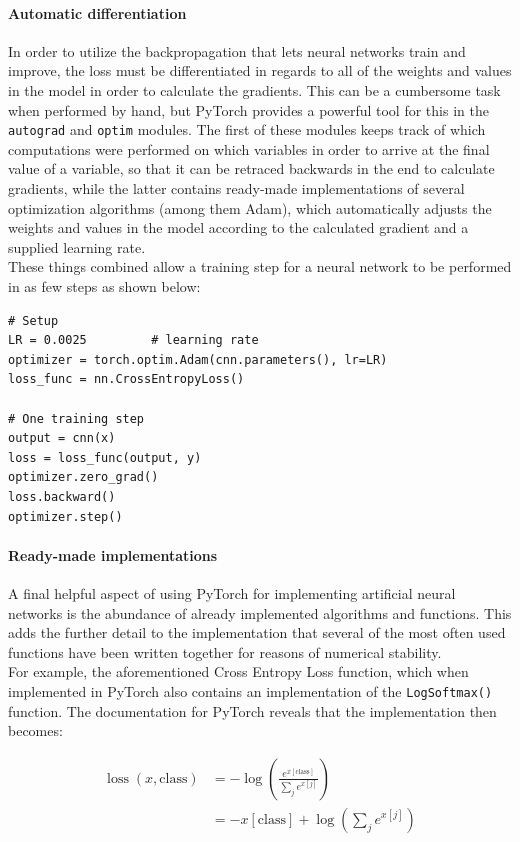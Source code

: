 \begin{multicols}{2}
\paragraph{Automatic differentiation}
In order to utilize the backpropagation that lets neural networks train and improve, the loss must be differentiated in regards to all of the weights and values in the model in order to calculate the gradients. This can be a cumbersome task when performed by hand, but PyTorch provides a powerful tool for this in the \texttt{autograd} and \texttt{optim} modules. The first of these modules keeps track of which computations were performed on which variables in order to arrive at the final value of a variable, so that it can be retraced backwards in the end to calculate gradients, while the latter contains ready-made implementations of several optimization algorithms (among them Adam), which automatically adjusts the weights and values in the model according to the calculated gradient and a supplied learning rate.\\
These things combined allow a training step for a neural network to be performed in as few steps as shown below:
\begin{lstlisting}
# Setup
LR = 0.0025         # learning rate
optimizer = torch.optim.Adam(cnn.parameters(), lr=LR)
loss_func = nn.CrossEntropyLoss()

# One training step
output = cnn(x)
loss = loss_func(output, y)
optimizer.zero_grad()
loss.backward()
optimizer.step()
\end{lstlisting}

\paragraph{Ready-made implementations}
A final helpful aspect of using PyTorch for implementing artificial neural networks is the abundance of already implemented algorithms and functions. This adds the further detail to the implementation that several of the most often used functions have been written together for reasons of numerical stability. \\
For example, the aforementioned Cross Entropy Loss function, which when implemented in PyTorch also contains an implementation of the \texttt{LogSoftmax()} function. The documentation for PyTorch reveals that the implementation then becomes:

\begin{align*}
\operatorname{loss}(x, \text {class})&=-\log \left(\frac{e^{ x[\text {class}]}}{\sum_{j} e^{ x[j]}}\right)\\
&=-x[\text {class}]+\log \left(\sum_{j} e^{x[j]}\right)
\end{align*}


\end{multicols}

